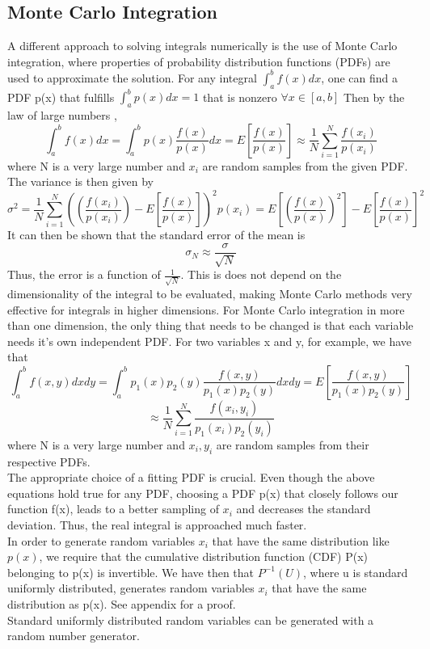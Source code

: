 \documentclass[10pt,a4paper]{article}
\begin{document}
\subsection{Monte Carlo Integration}
A different approach to solving integrals numerically is the use of Monte Carlo integration, where properties of probability distribution functions (PDFs) are used to approximate the solution. For any integral $\int_a^bf(x)dx$, one can find a PDF p(x) that fulfills  $\int_a^bp(x)dx=1$ that is nonzero $ \forall x\in [a,b]$ Then by the law of large numbers \cite{devore2012modern},
$$\int_a^bf(x)dx=\int_a^bp(x)\frac{f(x)}{p(x)}dx=E\left[\frac{f(x)}{p(x)}\right]\approx \frac{1}{N}\sum_{i=1}^{N}\frac{f(x_i)}{p(x_i)}$$
where N is a very large number and $x_i$ are random samples from the given PDF.\\
The variance is then given by
\[
\sigma^2=\frac{1}{N}\sum_{i=1}^{N}\left(\left( \frac{f(x_i)}{p(x_i)}\right)-E \left[\frac{f(x)}{p(x)} \right]\right)^2 p(x_i)=E\left[ \left( \frac{f(x)}{p(x)}\right)^2\right]-E\left[\frac{f(x)}{p(x)}\right]^2
\]
It can then be shown \cite{devore2012modern} that the standard error of the mean is
$$
\sigma_N \approx \frac{\sigma}{\sqrt{N}}
$$
Thus, the error is a function of $\frac{1}{\sqrt{N}}$. This is does not depend on the dimensionality of the integral to be evaluated, making Monte Carlo methods very effective for integrals in higher dimensions.
For Monte Carlo integration in more than one dimension, the only thing that needs to be changed is that each variable needs it's own independent PDF. For two variables x and y, for example, we have that 
$$\int_a^bf(x,y)dxdy=\int_a^bp_1(x)p_2(y)\frac{f(x,y)}{p_1(x)p_2(y)}dxdy=E\left[\frac{f(x,y)}{p_1(x)p_2(y)}\right]$$
$$\approx \frac{1}{N}\sum_{i=1}^{N}\frac{f(x_i,y_i)}{p_1(x_i)p_2(y_i)}$$
where N is a very large number and $x_i, y_i$ are random samples from their respective PDFs.\\
The appropriate choice of a fitting PDF is crucial. Even though the above equations hold true for any PDF, choosing a PDF p(x) that closely follows our function f(x), leads to a better sampling of $x_i$ \cite{devore2012modern} and decreases the standard deviation. Thus, the real integral is approached much faster.\\
In order to generate random variables $x_i$ that have the same distribution like $p(x)$, we require that the cumulative distribution function (CDF) P(x) belonging to p(x) is invertible. We have then that $P^{-1}(U)$, where u is standard uniformly distributed, generates random variables $x_i$ that have the same distribution as p(x). See appendix for a proof.\\
Standard uniformly distributed random variables can be generated with a random number generator. 
\end{document}
